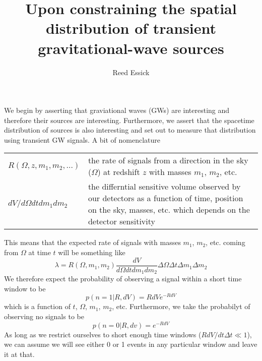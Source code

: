 \documentclass{article}
\begin{document}
\title{
Upon constraining the spatial distribution of transient gravitational-wave sources
}

\author{
Reed Essick
}

\maketitle


\doublespace


We begin by asserting that graviational waves (GWs) are interesting and therefore their sources are interesting.
Furthermore, we assert that the spacetime distribution of sources is also interesting and set out to measure that distribution using transient GW signals.
A bit of nomenclature

\vspace{1cm}
\begin{tabular}{p{3cm}p{8cm}}
    $R(\Omega, z, m_1, m_2, ...)$ & the rate of signals from a direction in the sky ($\Omega$) at redshift $z$ with masses $m_1$, $m_2$, etc. \\
    $dV/d\Omega dt dm_1 dm_2$     & the differntial sensitive volume observed by our detectors as a function of time, position on the sky, masses, etc. which depends on the detector sensitivity
\end{tabular}

This means that the expected rate of signals with masses $m_1$, $m_2$, etc. coming from $\Omega$ at time $t$ will be something like 
\begin{equation}
    \lambda = R(\Omega, m_1, m_2) \frac{dV}{d\Omega dt dm_1 dm_2} \Delta\Omega \Delta t \Delta m_1 \Delta m_2
\end{equation}
We therefore expect the probability of observing a signal within a short time window to be
\begin{equation}
    p(n=1|R, dV) = RdV e^{-RdV}
\end{equation}
which is a function of $t$, $\Omega$, $m_1$, $m_2$, etc.
Furthermore, we take the probabilyt of observing no signals to be
\begin{equation}
    p(n=0|R, dv) = e^{-RdV}
\end{equation}
As long as we restrict ourselves to short enough time windows ($RdV/dt \Delta t \ll 1$), we can assume we will see either 0 or 1 events in any particular window and leave it at that.
\end{document}
